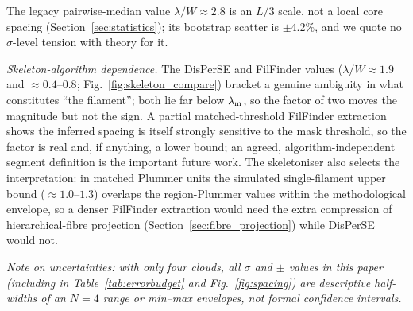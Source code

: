 \documentclass[usenatbib,twoside,twocolumn]{mnras}
\begin{document}
The legacy pairwise-median value $\lambda/W\approx2.8$ is an $L/3$ scale, not a local core spacing (Section~\ref{sec:statistics}); its bootstrap scatter is $\pm4.2\%$, and we quote no $\sigma$-level tension with theory for it.

\emph{Skeleton-algorithm dependence.} The DisPerSE and FilFinder values ($\lambda/W\approx1.9$ and $\approx0.4$--$0.8$; Fig.~\ref{fig:skeleton_compare}) bracket a genuine ambiguity in what constitutes ``the filament''; both lie far below $\lambda_{\rm m}$, so the factor of two moves the magnitude but not the sign. A partial matched-threshold FilFinder extraction shows the inferred spacing is itself strongly sensitive to the mask threshold, so the factor is real and, if anything, a lower bound; an agreed, algorithm-independent segment definition is the important future work. The skeletoniser also selects the interpretation: in matched Plummer units the simulated single-filament upper bound ($\approx1.0$--$1.3$) overlaps the region-Plummer values within the methodological envelope, so a denser FilFinder extraction would need the extra compression of hierarchical-fibre projection (Section~\ref{sec:fibre_projection}) while DisPerSE would not.

\noindent\emph{Note on uncertainties: with only four clouds, all $\sigma$ and $\pm$ values in this paper (including in Table~\ref{tab:errorbudget} and Fig.~\ref{fig:spacing}) are descriptive half-widths of an $N=4$ range or min--max envelopes, not formal confidence intervals.}
\end{document}

